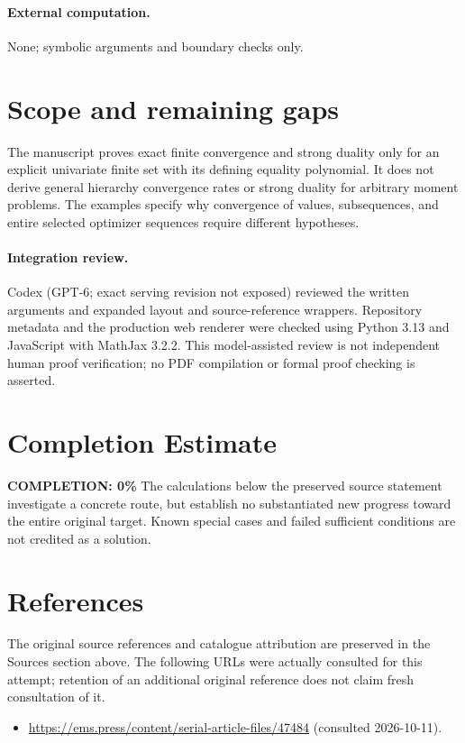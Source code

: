 \documentclass[11pt]{article}
\begin{document}
\paragraph{External computation.} None; symbolic arguments and boundary checks only.
\section{Scope and remaining gaps}

The manuscript proves exact finite convergence and strong duality only for an
explicit univariate finite set with its defining equality polynomial. It does
not derive general hierarchy convergence rates or strong duality for arbitrary
moment problems. The examples specify why convergence of values, subsequences,
and entire selected optimizer sequences require different hypotheses.

\paragraph{Integration review.} Codex (GPT-6; exact serving revision not exposed) reviewed the written arguments and expanded layout and source-reference wrappers. Repository metadata and the production web renderer were checked using Python 3.13 and JavaScript with MathJax 3.2.2. This model-assisted review is not independent human proof verification; no PDF compilation or formal proof checking is asserted.

\section{Completion Estimate}
\noindent\textbf{COMPLETION: 0\%}
The calculations below the preserved source statement investigate a concrete route,
but establish no substantiated new progress toward the entire original target.
Known special cases and failed sufficient conditions are not credited as a solution.
\section{References}
The original source references and catalogue attribution are preserved in the
Sources section above. The following URLs were actually consulted for this attempt;
retention of an additional original reference does not claim fresh consultation of it.
\begin{itemize}
\item \url{https://ems.press/content/serial-article-files/47484} (consulted 2026-10-11). 
\end{itemize}
\end{document}
